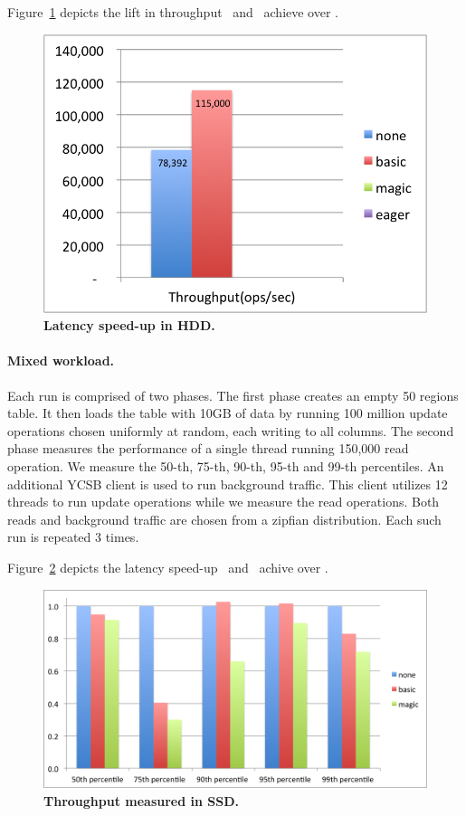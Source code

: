 Figure~\ref{fig:throughput-ssd} depicts the lift in throughput \basic\ and \magic\ achieve over \none.

\begin{figure}[htb]
\includegraphics[width=\figw]{Figs/throughput-ssd.png}
\caption{{\bf Latency speed-up in HDD.} 
}
\label{fig:throughput-ssd}
\end{figure}


\paragraph{Mixed workload.}
Each run is comprised of two phases. 
The first phase creates an empty 50 regions table. It then loads the table with 10GB of data by running 100 million update operations chosen uniformly at random, each writing to all columns. 
The second phase measures the performance of a single thread running 150,000 read operation. 
We measure the 50-th, 75-th, 90-th, 95-th and 99-th percentiles.
An additional YCSB client is used to run background traffic. 
This client utilizes 12 threads to run update operations while we measure the read operations. 
Both reads and background traffic are chosen from a zipfian distribution.
Each such run is repeated 3 times. 

Figure~\ref{fig:latency-speedup-hdd} depicts the latency speed-up \basic\ and \magic\ achive over \none.

\begin{figure}[htb]
\includegraphics[width=\figw]{Figs/latency-speedup-hdd.png}
\caption{{\bf Throughput measured in SSD.} 
}
\label{fig:latency-speedup-hdd}
\end{figure}

